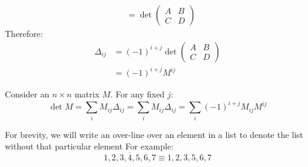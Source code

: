 \documentclass[../main.tex]{subfiles}
\begin{document}
\begin{remark}
\begin{align*}
    &= \det \left(\begin{array}{c|c}
      A & B \\ \hline
      C & D
    \end{array}\right)
  \end{align*}
  Therefore:
  \begin{align*}
    \Delta_{i j}&=(-1)^{i + j} \det \left(\begin{array}{c|c}
      A & B \\ \hline
      C & D
    \end{array}\right) \\
                &= (-1)^{i + j}M^{i j}
  \end{align*}
\end{remark}
\begin{theorem}
  Consider an $n \times n$ matrix $M$.
  For any fixed $j$:
  \[
    \det M = \sum_{i} M_{i j}\Delta_{i j} = \sum_{i} M_{i j}\Delta_{i j} = \sum_{i} (-1)^{i + j}M_{i j}M^{i j}
  \]
\end{theorem}
\begin{remark}[Notation]
  For brevity, we will write an over-line over an element in a list to denote the list without that particular element
  For example:
  \[
    1, 2, 3, \overline{4}, 5, 6, 7 \equiv 1, 2, 3, 5, 6, 7
  \]
\end{remark}
\end{document}
